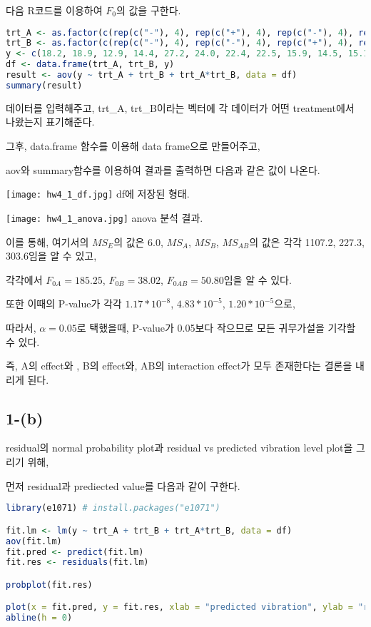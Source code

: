 \documentclass{article}
\begin{document}
다음 R코드를 이용하여 $F_0$의 값을 구한다.



\begin{lstlisting}[language=R]
trt_A <- as.factor(c(rep(c("-"), 4), rep(c("+"), 4), rep(c("-"), 4), rep(c("+"), 4)))
trt_B <- as.factor(c(rep(c("-"), 4), rep(c("-"), 4), rep(c("+"), 4), rep(c("+"), 4)))
y <- c(18.2, 18.9, 12.9, 14.4, 27.2, 24.0, 22.4, 22.5, 15.9, 14.5, 15.1, 14.2, 41.0, 43.9, 36.3, 39.9)
df <- data.frame(trt_A, trt_B, y)
result <- aov(y ~ trt_A + trt_B + trt_A*trt_B, data = df)
summary(result)
\end{lstlisting}

데이터를 입력해주고, trt\_A, trt\_B이라는 벡터에 각 데이터가 어떤 treatment에서 나왔는지 표기해준다.

그후, data.frame 함수를 이용해 data frame으로 만들어주고, 

aov와 summary함수를 이용하여 결과를 출력하면 다음과 같은 값이 나온다.

\begin{center}
    \texttt{[image: hw4\_1\_df.jpg]}
df에 저장된 형태.
\end{center} 

\begin{center}
    \texttt{[image: hw4\_1\_anova.jpg]}
anova 분석 결과.
\end{center} 

이를 통해, 여기서의 $MS_E$의 값은 6.0, $MS_{A}$, $MS_{B}$, $MS_{AB}$의 값은 각각 1107.2, 227.3, 303.6임을 알 수 있고,

각각에서 $F_{0A} = 185.25$, $F_{0B} = 38.02$, $F_{0AB} = 50.80 $임을 알 수 있다.

또한 이때의 P-value가 각각 $1.17 * 10^{-8}$, $4.83 * 10^{-5}$, $1.20 * 10^{-5}$으로,

따라서, $\alpha = 0.05$로 택했을때, P-value가 0.05보다 작으므로 모든 귀무가설을 기각할 수 있다.

즉, A의 effect와 , B의 effect와, AB의 interaction effect가 모두 존재한다는 결론을 내리게 된다.


\subsection{1-(b)}

residual의 normal probability plot과 residual vs predicted vibration level plot을 그리기 위해,

먼저 residual과 prediected value를 다음과 같이 구한다.


\begin{lstlisting}[language=R]
library(e1071) # install.packages("e1071")

fit.lm <- lm(y ~ trt_A + trt_B + trt_A*trt_B, data = df)
aov(fit.lm)
fit.pred <- predict(fit.lm)
fit.res <- residuals(fit.lm)

probplot(fit.res)

plot(x = fit.pred, y = fit.res, xlab = "predicted vibration", ylab = "residual", ylim = c(-5,5), main = "residual vs predicted vibration")
abline(h = 0)
\end{lstlisting}
\end{document}
